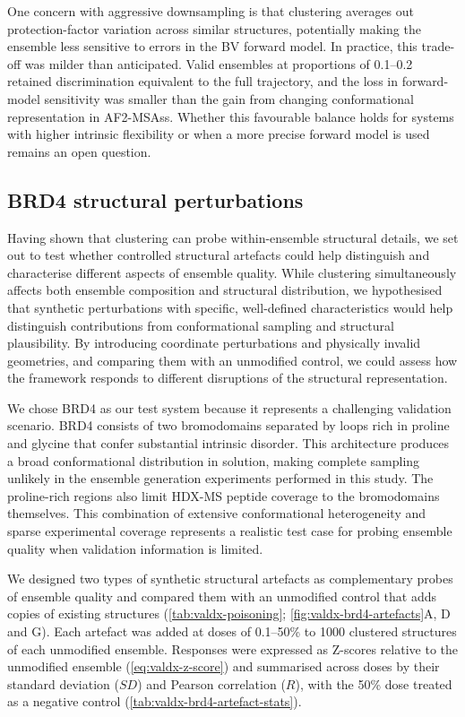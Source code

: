 One concern with aggressive downsampling is that clustering averages out protection-factor variation across similar structures, potentially making the ensemble less sensitive to errors in the BV forward model. In practice, this trade-off was milder than anticipated. Valid ensembles at proportions of 0.1--0.2 retained discrimination equivalent to the full trajectory, and the loss in forward-model sensitivity was smaller than the gain from changing conformational representation in AF2-MSAss. Whether this favourable balance holds for systems with higher intrinsic flexibility or when a more precise forward model is used remains an open question.

\subsection{BRD4 structural perturbations}
\label{sec:valdx-brd4-perturbations}

Having shown that clustering can probe within-ensemble structural details, we set out to test whether controlled structural artefacts could help distinguish and characterise different aspects of ensemble quality. While clustering simultaneously affects both ensemble composition and structural distribution, we hypothesised that synthetic perturbations with specific, well-defined characteristics would help distinguish contributions from conformational sampling and structural plausibility. By introducing coordinate perturbations and physically invalid geometries, and comparing them with an unmodified control, we could assess how the framework responds to different disruptions of the structural representation.

We chose BRD4 as our test system because it represents a challenging validation scenario. BRD4 consists of two bromodomains separated by loops rich in proline and glycine that confer substantial intrinsic disorder. This architecture produces a broad conformational distribution in solution, making complete sampling unlikely in the ensemble generation experiments performed in this study. The proline-rich regions also limit HDX-MS peptide coverage to the bromodomains themselves. This combination of extensive conformational heterogeneity and sparse experimental coverage represents a realistic test case for probing ensemble quality when validation information is limited.

We designed two types of synthetic structural artefacts as complementary probes of ensemble quality and compared them with an unmodified control that adds copies of existing structures (\cref{tab:valdx-poisoning}; \cref{fig:valdx-brd4-artefacts}A, D and G). Each artefact was added at doses of 0.1--50\% to 1000 clustered structures of each unmodified ensemble. Responses were expressed as Z-scores relative to the unmodified ensemble (\cref{eq:valdx-z-score}) and summarised across doses by their standard deviation ($SD$) and Pearson correlation ($R$), with the 50\% dose treated as a negative control (\cref{tab:valdx-brd4-artefact-stats}).

